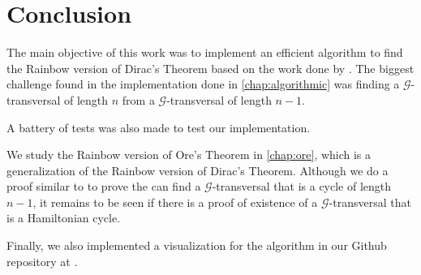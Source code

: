 
\chapter{Conclusion}

The main objective of this work was to implement an efficient algorithm to find
the Rainbow version of Dirac's Theorem based on the work done by \cite{Joos_2020}.
The biggest challenge found in the implementation done in \autoref{chap:algorithmic} was 
finding a $\mathcal{G}$-transversal of length $n$ from a $\mathcal{G}$-transversal of length $n - 1$.

A battery of tests was also made to test our implementation.

We study the Rainbow version of Ore's Theorem in \autoref{chap:ore}, which is a generalization of
the Rainbow version of Dirac's Theorem. Although we do a proof similar
to \cite{Joos_2020} to prove the can find a 
$ \mathcal{G} $-transversal that is a cycle of length $ n - 1 $, it remains
to be seen if there is a proof of existence of a 
$ \mathcal{G} $-transversal that is a Hamiltonian cycle.

Finally, we also implemented a visualization for the algorithm in our 
Github repository at
.
